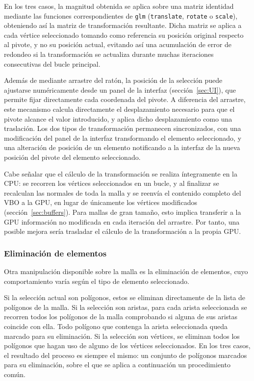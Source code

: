 En los tres casos, la magnitud obtenida se aplica sobre una matriz identidad mediante las funciones correspondientes de \texttt{glm} (\texttt{translate}, \texttt{rotate} o \texttt{scale}), obteniendo así la matriz de transformación resultante. Dicha matriz se aplica a cada vértice seleccionado tomando como referencia su posición original respecto al pivote, y no su posición actual, evitando así una acumulación de error de redondeo si la transformación se actualiza durante muchas iteraciones consecutivas del bucle principal.

Además de mediante arrastre del ratón, la posición de la selección puede ajustarse numéricamente desde un panel de la interfaz (sección~\ref{sec:UI}), que permite fijar directamente cada coordenada del pivote. A diferencia del arrastre, este mecanismo calcula directamente el desplazamiento necesario para que el pivote alcance el valor introducido, y aplica dicho desplazamiento como una traslación. Los dos tipos de transformación permanecen sincronizados, con una modificación del panel de la interfaz transformando el elemento seleccionado, y una alteración de posición de un elemento notificando a la interfaz de la nueva posición del pivote del elemento seleccionado.

Cabe señalar que el cálculo de la transformación se realiza íntegramente en la CPU: se recorren los vértices seleccionados en un bucle, y al finalizar se recalculan las normales de toda la malla y se reenvía el contenido completo del VBO a la GPU, en lugar de únicamente los vértices modificados (sección~\ref{sec:buffers}). Para mallas de gran tamaño, esto implica transferir a la GPU información no modificada en cada iteración del arrastre. Por tanto, una posible mejora sería trasladar el cálculo de la transformación a la propia GPU.

\subsubsection{Eliminación de elementos} \label{sec:eliminacion}

Otra manipulación disponible sobre la malla es la eliminación de elementos, cuyo comportamiento varía según el tipo de elemento seleccionado.

Si la selección actual son polígonos, estos se eliminan directamente de la lista de polígonos de la malla. Si la selección son aristas, para cada arista seleccionada se recorren todos los polígonos de la malla comprobando si alguna de sus aristas coincide con ella. Todo polígono que contenga la arista seleccionada queda marcado para su eliminación. Si la selección son vértices, se eliminan todos los polígonos que hagan uso de alguno de los vértices seleccionados. En los tres casos, el resultado del proceso es siempre el mismo: un conjunto de polígonos marcados para su eliminación, sobre el que se aplica a continuación un procedimiento común.

